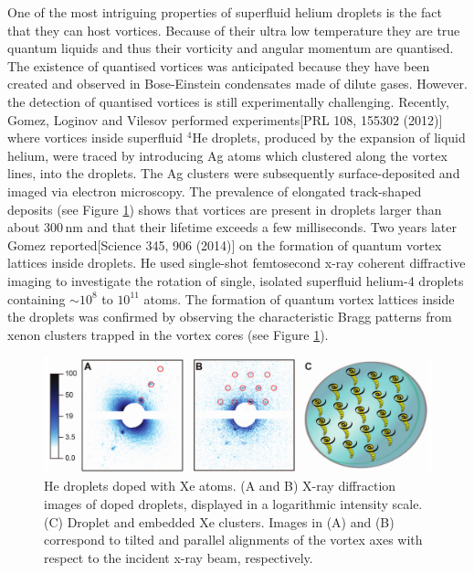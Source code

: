 \documentclass[12pt,a4paper]{book}
\newcommand{\unit}[1]{\,\mathrm{#1}}
\begin{document}
		One of the most intriguing properties of superfluid helium droplets is the fact that they can host vortices. Because of their ultra low temperature they are true quantum liquids and thus their vorticity and angular momentum are quantised. The existence of quantised vortices was anticipated because they have been created and observed in Bose-Einstein condensates made of dilute gases. However. the detection of quantised vortices is still experimentally challenging. Recently, Gomez, Loginov and Vilesov performed experiments[PRL 108, 155302 (2012)] where vortices inside superfluid $^4$He droplets, produced by the expansion of liquid helium, were traced by introducing Ag atoms which clustered along the vortex lines, into the droplets. The Ag clusters were subsequently surface-deposited and imaged via electron microscopy. The prevalence of elongated track-shaped deposits (see Figure \ref{fig:vortex-array}) shows that vortices are present in droplets larger than about $300\unit{nm}$ and that their lifetime exceeds a few milliseconds. Two years later Gomez reported[Science 345, 906 (2014)] on the formation of quantum vortex lattices inside droplets. He used single-shot femtosecond x-ray coherent diffractive imaging to investigate the rotation of single, isolated superfluid helium-4 droplets containing $\sim\!10^8$ to $10^{11}$ atoms. The formation of quantum vortex lattices inside the droplets was confirmed by observing the characteristic Bragg patterns from xenon clusters trapped in the vortex cores (see Figure \ref{fig:vortex-array}).\\

		\begin{figure}[t]
			\begin{center}
				\includegraphics[width=\textwidth]{vortex-array}
			\end{center}
			\caption{He droplets doped with Xe atoms. (A and B) X-ray diffraction images of doped droplets, displayed in a logarithmic intensity scale. (C) Droplet and embedded Xe clusters. Images in (A) and (B) correspond to tilted and parallel alignments of the vortex axes with respect to the incident x-ray beam, respectively.}
			\label{fig:vortex-array}
		\end{figure}
		
\end{document}
